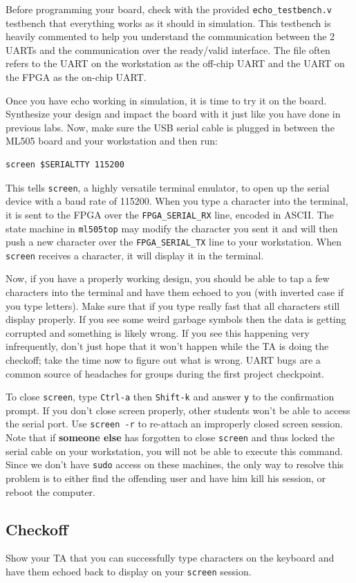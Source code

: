 \documentclass[11pt]{article}
\begin{document}
Before programming your board, check with the provided \verb|echo_testbench.v| testbench that everything works as it should in simulation. This testbench is heavily commented to help you understand the communication between the 2 UARTs and the communication over the ready/valid interface. The file often refers to the UART on the workstation as the off-chip UART and the UART on the FPGA as the on-chip UART.

Once you have echo working in simulation, it is time to try it on the board. Synthesize your design and impact the board with it just like you have done in previous labs. Now, make sure the USB serial cable is plugged in between the ML505 board and your workstation and then run:

\begin{verbatim}
screen $SERIALTTY 115200
\end{verbatim}

This tells \verb|screen|, a highly versatile terminal emulator, to open up the serial device with a baud rate of 115200. When you type a character into the terminal, it is sent to the FPGA over the \verb|FPGA_SERIAL_RX| line, encoded in ASCII. The state machine in \verb|ml505top| may modify the character you sent it and will then push a new character over the \verb|FPGA_SERIAL_TX| line to your workstation. When \verb|screen| receives a character, it will display it in the terminal.

Now, if you have a properly working design, you should be able to tap a few characters into the terminal and have them echoed to you (with inverted case if you type letters). Make sure that if you type really fast that all characters still display properly. If you see some weird garbage symbols then the data is getting corrupted and something is likely wrong. If you see this happening very infrequently, don't just hope that it won't happen while the TA is doing the checkoff; take the time now to figure out what is wrong. UART bugs are a common source of headaches for groups during the first project checkpoint. 

To close \verb|screen|, type \verb|Ctrl-a| then \verb|Shift-k| and answer \verb|y| to the confirmation prompt. If you don't close screen properly, other students won't be able to access the serial port. Use \verb|screen -r| to re-attach an improperly closed screen session. Note that if \textbf{someone else} has forgotten to close \verb|screen| and thus locked the serial cable on your workstation, you will not be able to execute this command. Since we don’t have \verb|sudo| access on these machines, the only way to resolve this problem is to either find the offending user and have him kill his session, or reboot the computer.

\subsection{Checkoff}
Show your TA that you can successfully type characters on the keyboard and have them echoed back to display on your \verb|screen| session.
\end{document}
